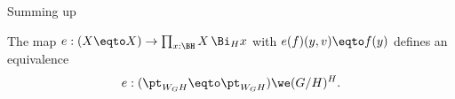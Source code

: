 Summing up
\begin{lemma}
  \label{lem:WGHisHfixofG/H}
  The map  $e:(X\eqto X)\to \prod_{x:\BH}X\, \Bi_Hx$ with $e(f)(y,v)\eqto f(y)$ defines an equivalence
$$e:(\pt_{W_GH}\eqto \pt_{W_GH})\we (G/H)^H.$$
\end{lemma}



